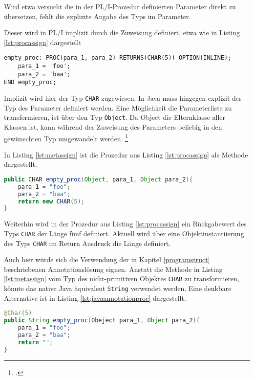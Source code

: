 Wird etwa versucht die in der PL/I-Prozedur definierten Parameter direkt zu übersetzen, fehlt die explizite Angabe des Typs im Parameter.

Dieser wird in PL/I implizit durch die Zuweisung definiert, etwa wie in Listing \ref{lst:procassign} dargestellt

\begin{lstlisting}[language=PL/I, caption=Zuweisung von Variablen in einer Prozedur, label={lst:procassign}]
empty_proc: PROC(para_1, para_2) RETURNS(CHAR(5)) OPTION(INLINE);
	para_1 = 'foo';
	para_2 = 'baa';
END empty_proc;
\end{lstlisting}

Implizit wird hier der Typ \verb+CHAR+ zugewiesen. 
In Java muss hingegen explizit der Typ des Parameter definiert werden.
Eine M\"oglichkeit die Parameterliste zu transformieren, ist über den Typ \verb+Object+.
Da Object die Elternklasse aller Klassen ist, kann während der Zuweisung des Parameters beliebig in den gewünschten Typ umgewandelt werden. \footcite[Vgl. ][]{objectdocs}

In Listing \ref{lst:metassign} ist die Prozedur aus Listing \ref{lst:procassign} als Methode dargestellt.

\begin{lstlisting}[language=Java, caption=\"Ubersetzung der Prozedur, label={lst:metassign}]
public CHAR empty_proc(Object, para_1, Object para_2){
	para_1 = "foo";
	para_2 = "baa";
	return new CHAR(5);
}
\end{lstlisting} 

Weiterhin wird in der Prozedur aus Listing \ref{lst:procassign} ein R\"uckgabewert des Typs \verb+CHAR+ der L\"ange f\"unf definiert.
Aktuell wird \"uber eine Objektinstantiierung des Typs \verb+CHAR+ im Return Ausdruck die L\"ange definiert.

Auch hier würde sich die Verwendung der in Kapitel \ref{programstruct} beschriebenen Annotationslösung eignen. Anstatt die Methode in Listing \ref{lst:metassign} vom Typ des nicht-primitiven Objektes \verb+CHAR+ zu transformieren, könnte das native Java äquivalent \verb+String+ verwendet werden.
Eine denkbare Alternative ist in Listing \ref{lst:javaannotationproc} dargestellt.

\begin{lstlisting}[language=Java, caption=Java-Annotation für übersetze Prozeduren, label={lst:javaannotationproc}]
@Char(5)
public String empty_proc(Obeject para_1, Object para_2){
	para_1 = "foo";
	para_2 = "baa";
	return "";
}
\end{lstlisting} 

